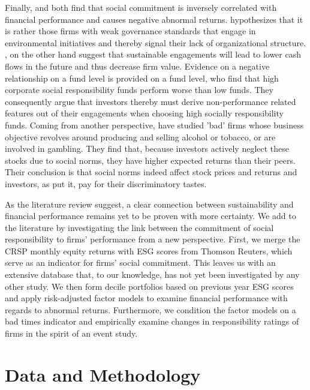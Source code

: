 \documentclass[11pt]{article}
\begin{document}
Finally, \citet{Fisher-Vanden2011} and \citet{Boyle1997} both find that social commitment is inversely correlated with financial performance and causes negative abnormal returns. \citet{Fisher-Vanden2011} hypothesizes that it is rather those firms with weak governance standards that engage in environmental initiatives and thereby signal their lack of organizational structure. \citet{Boyle1997}, on the other hand suggest that sustainable engagements will lead to lower cash flows in the future and thus decrease firm value. Evidence on a negative relationship on a fund level is provided \citet{ElGhoul2017} on a fund level, who find that high corporate social responsibility funds perform worse than low funds. They consequently argue that investors thereby must derive non-performance related features out of their engagements when choosing high socially responsibility funds. Coming from another perspective, \citet{Hong2009} have studied 'bad' firms whose business objective revolves around producing and selling alcohol or tobacco, or are involved in gambling. They find that, because investors actively neglect these stocks due to social norms, they have higher expected returns than their peers. Their conclusion is that social norms indeed affect stock prices and returns and investors, as \citet{Hong2009} put it, pay for their discriminatory tastes.

As the literature review suggest, a clear connection between sustainability and financial performance remains yet to be proven with more certainty. We add to the literature by investigating the link between the commitment of social responsibility to firms’ performance from a new perspective. First, we merge the CRSP monthly equity returns with ESG scores from Thomson Reuters, which serve as an indicator for firms’ social commitment. This leaves us with an extensive database that, to our knowledge, has not yet been investigated by any other study. We then form decile portfolios based on previous year ESG scores and apply risk-adjusted factor models to examine financial performance with regards to abnormal returns. Furthermore, we condition the factor models on a bad times indicator and empirically examine changes in responsibility ratings of firms in the spirit of an event study. 


\section{Data and Methodology}
\end{document}
